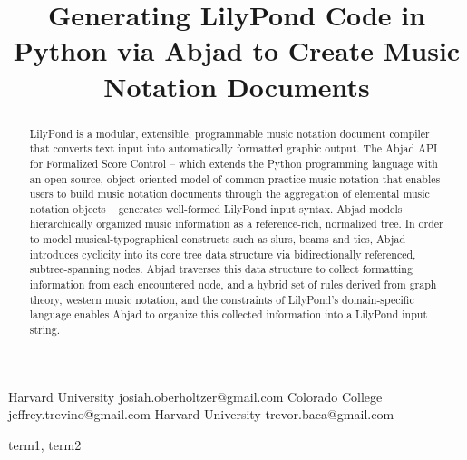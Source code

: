 \documentclass{sigplanconf}
\begin{document}
\setlength{\pdfpageheight}{\paperheight}
\setlength{\pdfpagewidth}{\paperwidth}



\title{Generating LilyPond Code in Python via Abjad to Create Music Notation Documents}

           {Harvard University}
           {josiah.oberholtzer@gmail.com}
           {Colorado College}
           {jeffrey.trevino@gmail.com}
           {Harvard University}
           {trevor.baca@gmail.com}

\maketitle

\begin{abstract}
LilyPond is a modular, extensible, programmable music notation document
compiler that converts text input into automatically formatted graphic output.
The Abjad API for Formalized Score Control -- which extends the Python
programming language with an open-source, object-oriented model of
common-practice music notation that enables users to build music notation
documents through the aggregation of elemental music notation objects --
generates well-formed LilyPond input syntax. Abjad models hierarchically
organized music information as a reference-rich, normalized tree. In order to
model musical-typographical constructs such as slurs, beams and ties, Abjad
introduces cyclicity into its core tree data structure via bidirectionally
referenced, subtree-spanning nodes. Abjad traverses this data structure to
collect formatting information from each encountered node, and a hybrid set of
rules derived from graph theory, western music notation, and the constraints of
LilyPond's domain-specific language enables Abjad to organize this collected
information into a LilyPond input string.
\end{abstract}


\terms
term1, term2
\end{document}
